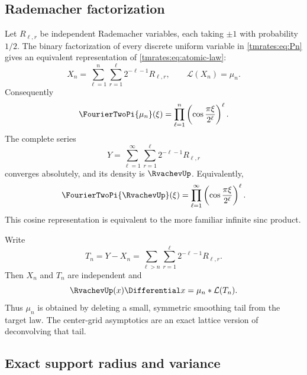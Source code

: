 \documentclass[11pt,oneside]{article}
\theoremstyle{definition}
\theoremstyle{remark}
\begin{document}
\subsection{Rademacher factorization}

Let $R_{\ell,r}$ be independent Rademacher variables, each taking $\pm1$ with probability
$1/2$.  The binary factorization of every discrete uniform variable in \eqref{tmrates:eq:Pn} gives
an equivalent representation of \eqref{tmrates:eq:atomic-law}:
\begin{equation}
 X_n=\sum_{\ell=1}^{n}\sum_{r=1}^{\ell}
       2^{-\ell-1}R_{\ell,r},
 \qquad \mathcal L(X_n)=\mu_n.                            \label{tmrates:eq:Xn}
\end{equation}
Consequently
\begin{equation}
 \FourierTwoPi{\mu_n}(\xi)
 =\prod_{\ell=1}^{n}
  \left(\cos\frac{\pi\xi}{2^\ell}\right)^\ell.          \label{tmrates:eq:finite-cosine}
\end{equation}
The complete series
\begin{equation}
 Y=\sum_{\ell=1}^{\infty}\sum_{r=1}^{\ell}
       2^{-\ell-1}R_{\ell,r}                              \label{tmrates:eq:Y}
\end{equation}
converges absolutely, and its density is $\RvachevUp$.  Equivalently,
\begin{equation}
 \FourierTwoPi{\RvachevUp}(\xi)
 =\prod_{\ell=1}^{\infty}
  \left(\cos\frac{\pi\xi}{2^\ell}\right)^\ell.          \label{tmrates:eq:infinite-cosine}
\end{equation}
This cosine representation is equivalent to the more familiar infinite sinc product.

Write
\begin{equation}
 T_n=Y-X_n
 =\sum_{\ell>n}\sum_{r=1}^{\ell}2^{-\ell-1}R_{\ell,r}.    \label{tmrates:eq:Tn}
\end{equation}
Then $X_n$ and $T_n$ are independent and
\begin{equation}
 \RvachevUp(x)\Differential x=\mu_n*\mathcal L(T_n).                        \label{tmrates:eq:tail-convolution}
\end{equation}
Thus $\mu_n$ is obtained by deleting a small, symmetric smoothing tail from the target law.
The center-grid asymptotics are an exact lattice version of deconvolving that tail.

\subsection{Exact support radius and variance}
\end{document}
